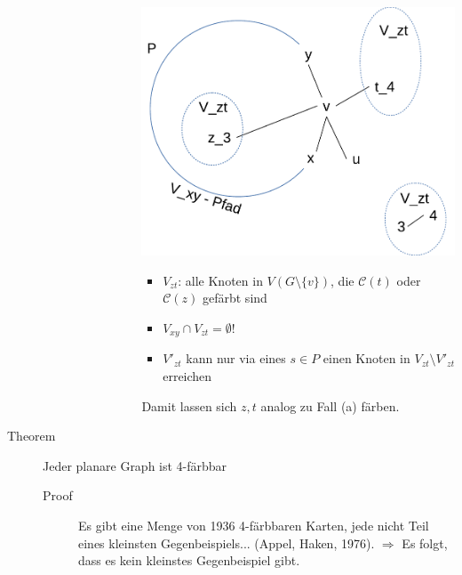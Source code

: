 \begin{description}
\begin{description}
\begin{enumerate}
\begin{itemize}
\begin{enumerate}
                                    \includegraphics[scale=0.5]{lectures/161125/pix/3.pdf}
                                        \begin{itemize}
                                            \item $V_{zt}$: alle Knoten in $V(G \setminus \{v\})$, die $\mathcal{C}(t)$ oder $\mathcal{C}(z)$ gefärbt sind
                                            \item $V_{xy} \cap V_{zt} = \emptyset$!
                                            \item $V'_{zt}$ kann nur via eines $s \in P$ einen Knoten in $V_{zt} \setminus V'_{zt}$ erreichen
                                        \end{itemize}
                                        Damit lassen sich $z,t$ analog zu Fall (a) färben.
                                \end{enumerate}
                        \end{itemize}
                \end{enumerate}
        \end{description}
    \item[Theorem] Jeder planare Graph ist 4-färbbar
        \begin{description}
            \item[Proof] Es gibt eine Menge von 1936 4-färbbaren Karten, jede nicht Teil eines kleinsten Gegenbeispiels... (Appel, Haken, 1976).
            $\Rightarrow$ Es folgt, dass es kein kleinstes Gegenbeispiel gibt.
        \end{description}
\end{description}

